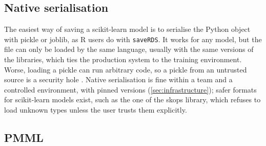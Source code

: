 \subsection{Native serialisation}

The easiest way of saving a scikit-learn model is to serialise the Python object with pickle or joblib,
as R users do with \texttt{saveRDS}. It works for any model, but the file can only be loaded by the same
language, usually with the same versions of the libraries, which ties the production system to the
training environment. Worse, loading a pickle can run arbitrary code, so a pickle from an untrusted
source is a security hole \citep{pythonpickle}. Native serialisation is fine within a team and a
controlled environment, with pinned versions (\cref{sec:infrastructure}); safer formats for scikit-learn
models exist, such as the one of the skops library, which refuses to load unknown types unless the user
trusts them explicitly.

\subsection{PMML\extsec}

